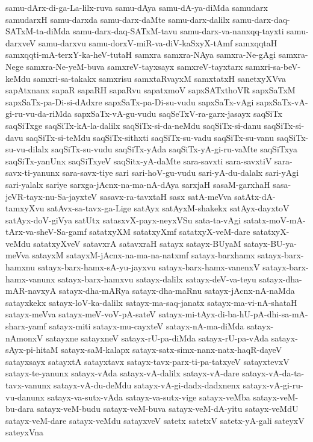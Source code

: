 {samu-dArx-di-ga-La-lilx-ruva
samu-dAya
samu-dA-ya-diMda
samudarx
samudarxH
samu-darxda
samu-darx-daMte
samu-darx-dalilx
samu-darx-daq-SATxM-ta-diMda
samu-darx-daq-SATxM-tavu
samu-darx-va-nanxqq-tayxti
samu-darxveV
samu-darxvu
samu-dorxV-miR-va-diV-kaSxyX-tAmf
samxqqtaH
samxqqti-mA-terxY-ka-heV-tutaH
samxra
samxra-NAya
samxra-Ne-gAgi
samxra-Nege
samxra-Ne-yeM-buva
samxreV-tayxsayx
samxreV-tayxtarx
samxri-sa-beV-keMdu
samxri-sa-takakx
samxrisu
samxtaRvayxM
samxtatxH
sanetxyXVva
sapAtxnanx
sapaR
sapaRH
sapaRvu
sapatxmoV
sapxSATxthoVR
sapxSaTxM
sapxSaTx-pa-Di-si-dAdxre
sapxSaTx-pa-Di-su-vudu
sapxSaTx-vAgi
sapxSaTx-vA-gi-ru-vu-da-riMda
sapxSaTx-vA-gu-vudu
saqSeTxV-ra-garx-jasayx
saqSiTx
saqSiTxge
saqSiTx-kA-la-dalilx
saqSiTx-si-da-neMdu
saqSiTx-si-danu
saqSiTx-si-davu
saqSiTx-si-teMdu
saqSiTx-sithxti
saqSiTx-su-vadu
saqSiTx-su-vanu
saqSiTx-su-vu-dilalx
saqSiTx-su-vudu
saqSiTx-yAda
saqSiTx-yA-gi-ru-vaMte
saqSiTxya
saqSiTx-yanUnx
saqSiTxyeV
saqSitx-yA-daMte
sara-savxti
sara-savxtiV
sara-savx-ti-yanunx
sara-savx-tiye
sari
sari-hoV-gu-vudu
sari-yA-du-dalalx
sari-yAgi
sari-yalalx
sariye
sarxga-jAcnx-na-ma-nA-dAya
sarxjaH
sasaM-garxhaH
sasa-jeVR-tayx-nu-Sa-jayxteV
sasavx-ra-tavxtaH
sasx
satA-meVva
satAtx-dA-tamxyXvu
satAvx-sa-tavx-ga-Lige
satAyx
satAyxM-shakekx
satAyx-dayxtoV
satAyx-doV-giVya
satUtx
satasxvX-payx-neyxVSu
sata-ta-vAgi
satatx-moV-mA-tArx-va-sheV-Sa-gamf
satatxyXM
satatxyXmf
satatxyX-veM-dare
satatxyX-veMdu
satatxyXveV
satavxrA
satavxraH
satayx
satayx-BUyaM
satayx-BU-ya-meVva
satayxM
satayxM-jAcnx-na-ma-na-natxmf
satayx-barxhamx
satayx-barx-hamxnu
satayx-barx-hamx-sA-yu-jayxvu
satayx-barx-hamx-vanenxV
satayx-barx-hamx-vanunx
satayx-barx-hamxvu
satayx-dalilx
satayx-deV-va-teyu
satayx-dha-mAR-navxyA
satayx-dha-mARya
satayx-dha-maRnu
satayx-jAcnx-nA-naMda
satayxkekx
satayx-loV-ka-dalilx
satayx-ma-saq-janatx
satayx-ma-vi-nA-shataH
satayx-meVva
satayx-meV-voV-pA-sateV
satayx-mi-tAyx-di-ba-hU-pA-dhi-sa-mA-sharx-yamf
satayx-miti
satayx-mu-cayxteV
satayx-nA-ma-diMda
satayx-nAmonxV
satayxne
satayxneV
satayx-rU-pa-diMda
satayx-rU-pa-vAda
satayx-sAyx-pi-hitaM
satayx-saM-kalapx
satayx-satx-simx-nanx-natx-haqR-dayeV
satayxsayx
satayxtA
satayxtavx
satayx-tavx-parx-ti-pa-tatxyeV
satayxtevxV
satayx-te-yanunx
satayx-vAda
satayx-vA-dalilx
satayx-vA-dare
satayx-vA-da-ta-tavx-vanunx
satayx-vA-du-deMdu
satayx-vA-gi-dadx-dadxnenx
satayx-vA-gi-ru-vu-danunx
satayx-va-sutx-vAda
satayx-va-sutx-vige
satayx-veMba
satayx-veM-bu-dara
satayx-veM-budu
satayx-veM-buva
satayx-veM-dA-yitu
satayx-veMdU
satayx-veM-dare
satayx-veMdu
satayxveV
satetx
satetxV
satetx-yA-gali
sateyxV
sateyxVna
}
